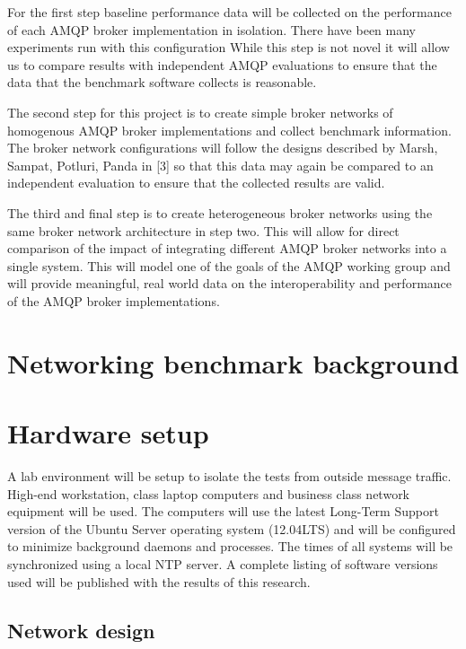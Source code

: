 \documentclass{thesis}
\begin{document}
For the first step baseline performance data will be collected on the performance of each AMQP broker implementation in isolation.  There have been many experiments run with this configuration %
While this step is not novel it will allow us to compare results with independent AMQP evaluations to ensure that the data that the benchmark software collects is reasonable.

The second step for this project is to create simple broker networks of homogenous AMQP broker implementations and collect benchmark information.  The broker network configurations will follow the designs described by  Marsh, Sampat, Potluri, Panda in [3] so that this data may again be compared to an independent evaluation to ensure that the collected results are valid.

The third and final step is to create heterogeneous broker networks using the same broker network architecture in step two.  This will allow for direct comparison of the impact of integrating different AMQP broker networks into a single system.  This will model one of the goals of the AMQP working group and will provide meaningful, real world data on the interoperability and performance of the AMQP broker implementations. 

\section{Networking benchmark background}

\section{Hardware setup}
A lab environment will be setup to isolate the tests from outside message traffic.  High-end workstation, class laptop computers and business class network equipment will be used.  The computers will use the latest Long-Term Support version of the Ubuntu Server operating system (12.04LTS) and will be configured to minimize background daemons and processes.  The times of all systems will be synchronized using a local NTP server. A complete listing of software versions used will be published with the results of this research.

\subsection{Network design}
\end{document}
